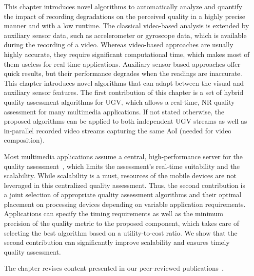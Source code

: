 This chapter introduces novel algorithms to automatically analyze and quantify the impact of recording degradations on the perceived quality in a highly precise manner and with a low runtime.
The classical video-based analysis is extended by auxiliary sensor data, such as accelerometer or gyroscope data, which is available during the recording of a video.
Whereas video-based approaches are usually highly accurate, they require significant computational time, which makes most of them useless for real-time applications.
Auxiliary sensor-based approaches offer quick results, but their performance degrades when the readings are inaccurate.
This chapter introduces novel algorithms that can adapt between the visual and auxiliary sensor features.
The first contribution of this chapter is a set of hybrid quality assessment algorithms for \ac{UGV}, which allows a real-time, \ac{NR} quality assessment for many multimedia applications.
If not stated otherwise, the proposed algorithms can be applied to both independent \ac{UGV} streams as well as in-parallel recorded video streams capturing the same \ac{AoI} (needed for video composition).

Most multimedia applications assume a central, high-performance server for the quality assessment~\cite{Shrestha2010,Zhang2012}, which limits the assessment's real-time suitability and the scalability. 
While scalability is a must, resources of the mobile devices are not leveraged in this centralized quality assessment.
Thus, the second contribution is a joint selection of appropriate quality assessment algorithms and their optimal placement on processing devices depending on variable application requirements.
Applications can specify the timing requirements as well as the minimum precision of the quality metric to the proposed component, which takes care of selecting the best algorithm based on a utility-to-cost ratio. 
We show that the second contribution can significantly improve scalability and ensures timely quality assessment.

The chapter revises content presented in our peer-reviewed publications~\cite{Wilk2016e,Wilk2015c,Wilk2016g}.
